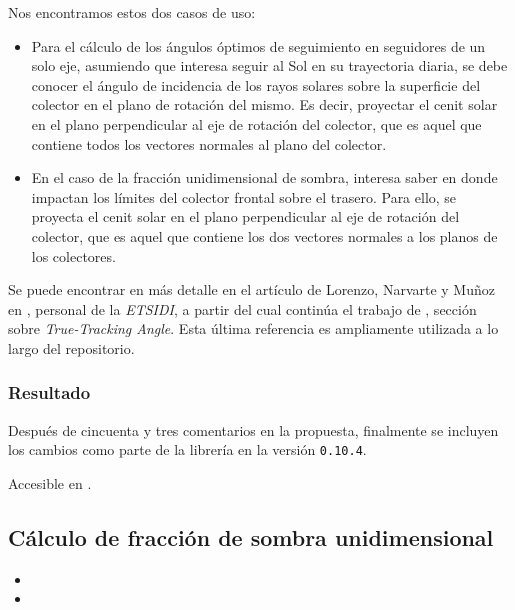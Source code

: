 Nos encontramos estos dos casos de uso:

\begin{itemize}
    \item Para el cálculo de los ángulos óptimos de seguimiento en seguidores de un solo eje, asumiendo que interesa seguir al Sol en su trayectoria diaria, se debe conocer el ángulo de incidencia de los rayos solares sobre la superficie del colector en el plano de rotación del mismo. Es decir, proyectar el cenit solar en el plano perpendicular al eje de rotación del colector, que es aquel que contiene todos los vectores normales al plano del colector.
    \item En el caso de la fracción unidimensional de sombra, interesa saber en donde impactan los límites del colector frontal sobre el trasero. Para ello, se proyecta el cenit solar en el plano perpendicular al eje de rotación del colector, que es aquel que contiene los dos vectores normales a los planos de los colectores.
\end{itemize}

Se puede encontrar en más detalle en el artículo de Lorenzo, Narvarte y Muñoz en \cite{Lorenzo_Narvarte_Muñoz_2011}, personal de la \textit{ETSIDI}, a partir del cual continúa el trabajo de \cite{Anderson_Mikofski_2020}, sección sobre \textit{True-Tracking Angle}. Esta última referencia es ampliamente utilizada a lo largo del repositorio.

\subsubsection{Resultado}

Después de cincuenta y tres comentarios en la propuesta, finalmente se incluyen los cambios como parte de la librería en la versión \texttt{0.10.4}.

Accesible en .

\subsection{Cálculo de fracción de sombra unidimensional} \label{sct:desarrollo:contribuciones_cientificas:fraccion_sombra}

\begin{itemize}
    \item {}
    \item {}
\end{itemize}

